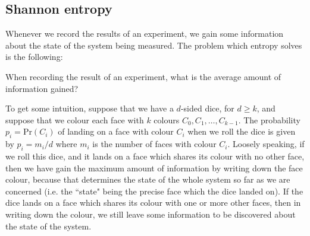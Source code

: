 \documentclass[a4paper,11pt,twoside]{article}
\theoremstyle{definition}
\theoremstyle{remark}
\begin{document}
\subsection{Shannon entropy}
Whenever we record the results of an experiment, we gain some information about the state of the system being measured. The problem which entropy solves is the following:
\begin{center}
When recording the result of an experiment, what is the average amount of information gained?
\end{center}
To get some intuition, suppose that we have a $d$-sided dice, for $d\geqslant k$, and suppose that we colour each face with $k$ colours $C_0,C_1,\dots,C_{k-1}$. The probability $p_i=\mathrm{Pr}(C_i)$ of landing on a face with colour $C_i$ when we roll the dice is given by $p_i=m_i/d$ where $m_i$ is the number of faces with colour $C_i$. Loosely speaking, if we roll this dice, and it lands on a face which shares its colour with no other face, then we have gain the maximum amount of information by writing down the face colour, because that determines the state of the whole system so far as we are concerned (i.e. the ``state" being the precise face which the dice landed on). If the dice lands on a face which shares its colour with one or more other faces, then in writing down the colour, we still leave some information to be discovered about the state of the system.
\end{document}
